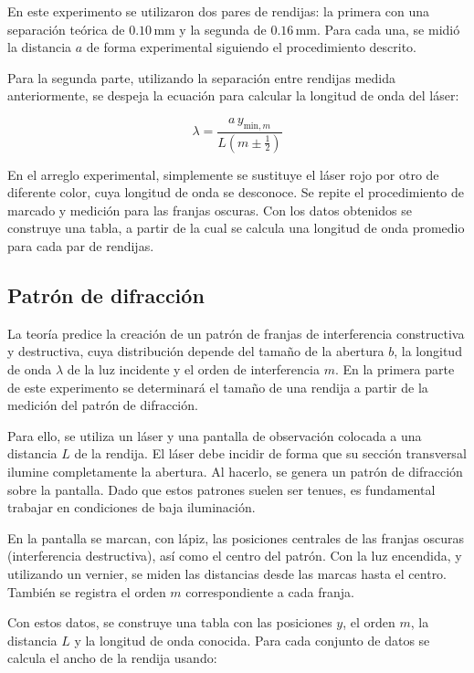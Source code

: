 \documentclass[article,12pt]{elsarticle}
\begin{document}
En este experimento se utilizaron dos pares de rendijas: la primera con una separación teórica de $0.10\, \text{mm}$ y la segunda de $0.16\, \text{mm}$. Para cada una, se midió la distancia $a$ de forma experimental siguiendo el procedimiento descrito.

Para la segunda parte, utilizando la separación entre rendijas medida anteriormente, se despeja la ecuación para calcular la longitud de onda del láser:

\[
\lambda = \frac{a \, y_{\text{min}, m}}{L \left( m \pm \frac{1}{2} \right)}
\]

En el arreglo experimental, simplemente se sustituye el láser rojo por otro de diferente color, cuya longitud de onda se desconoce. Se repite el procedimiento de marcado y medición para las franjas oscuras. Con los datos obtenidos se construye una tabla, a partir de la cual se calcula una longitud de onda promedio para cada par de rendijas.

\subsection*{Patrón de difracción}

La teoría predice la creación de un patrón de franjas de interferencia constructiva y destructiva, cuya distribución depende del tamaño de la abertura $b$, la longitud de onda $\lambda$ de la luz incidente y el orden de interferencia $m$. En la primera parte de este experimento se determinará el tamaño de una rendija a partir de la medición del patrón de difracción.

Para ello, se utiliza un láser y una pantalla de observación colocada a una distancia $L$ de la rendija. El láser debe incidir de forma que su sección transversal ilumine completamente la abertura. Al hacerlo, se genera un patrón de difracción sobre la pantalla. Dado que estos patrones suelen ser tenues, es fundamental trabajar en condiciones de baja iluminación.

En la pantalla se marcan, con lápiz, las posiciones centrales de las franjas oscuras (interferencia destructiva), así como el centro del patrón. Con la luz encendida, y utilizando un vernier, se miden las distancias desde las marcas hasta el centro. También se registra el orden $m$ correspondiente a cada franja.

Con estos datos, se construye una tabla con las posiciones $y$, el orden $m$, la distancia $L$ y la longitud de onda conocida. Para cada conjunto de datos se calcula el ancho de la rendija usando:
\end{document}
